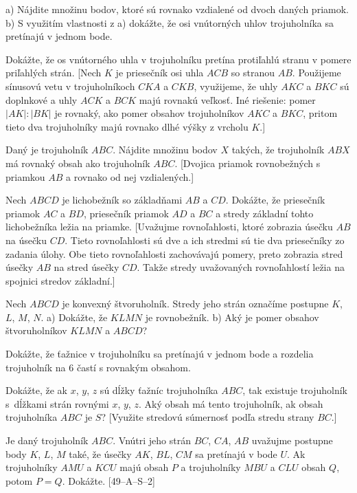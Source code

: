{
a) Nájdite množinu bodov, ktoré sú rovnako vzdialené od dvoch daných priamok.\hfil\break
b) S využitím vlastnosti z a) dokážte, že osi vnútorných uhlov trojuholníka sa pretínajú v jednom bode.

Dokážte, že os vnútorného uhla v trojuholníku pretína protiľahlú stranu v pomere priľahlých strán. [Nech $K$ je priesečník osi uhla $ACB$ so stranou $AB$. Použijeme sínusovú vetu v trojuholníkoch $CKA$ a $CKB$, využijeme, že uhly $AKC$ a $BKC$ sú doplnkové a uhly $ACK$ a $BCK$ majú rovnakú veľkosť. Iné riešenie: pomer $|AK|\colon |BK|$ je rovnaký, ako pomer obsahov trojuholníkov $AKC$ a $BKC$, pritom tieto dva trojuholníky majú rovnako dlhé výšky z vrcholu $K$.]

Daný je trojuholník $ABC$. Nájdite množinu bodov $X$ takých, že trojuholník $ABX$ má rovnaký obsah ako trojuholník $ABC$. [Dvojica priamok rovnobežných s priamkou $AB$ a rovnako od nej vzdialených.]

Nech $ABCD$ je lichobežník so základňami $AB$ a $CD$. Dokážte, že priesečník priamok $AC$ a $BD$, priesečník priamok $AD$ a $BC$ a stredy základní tohto lichobežníka ležia na priamke. [Uvažujme rovnoľahlosti, ktoré zobrazia úsečku $AB$ na úsečku $CD$. Tieto rovnoľahlosti sú dve a ich stredmi sú tie dva priesečníky zo zadania úlohy. Obe tieto rovnoľahlosti zachovávajú pomery, preto zobrazia stred úsečky $AB$ na stred úsečky $CD$. Takže stredy uvažovaných rovnoľahlostí ležia na spojnici stredov základní.]

Nech $ABCD$ je konvexný štvoruholník. Stredy jeho strán označíme postupne $K$, $L$, $M$, $N$.\hfil\break
a) Dokážte, že $KLMN$ je rovnobežník.\hfil\break
b) Aký je pomer obsahov štvoruholníkov $KLMN$ a $ABCD$?

\D

Dokážte, že ťažnice v trojuholníku sa pretínajú v jednom bode a rozdelia trojuholník na $6$ častí s rovnakým obsahom.

Dokážte, že ak $x$, $y$, $z$ sú dĺžky ťažníc trojuholníka $ABC$, tak existuje trojuholník s~dĺžkami strán rovnými $x$, $y$, $z$. Aký obsah má tento trojuholník, ak obsah trojuholníka $ABC$ je $S$? [Využite stredovú súmernosť podľa stredu strany $BC$.]

Je daný trojuholník $ABC$. Vnútri jeho strán $BC$, $CA$, $AB$ uvažujme postupne body $K$, $L$, $M$ také, že úsečky $AK$, $BL$, $CM$ sa pretínajú v bode $U$.
Ak trojuholníky $AMU$ a $KCU$ majú obsah $P$ a trojuholníky $MBU$ a $CLU$ obsah $Q$, potom $P=Q$. Dokážte.
[49--A--S--2]

}
